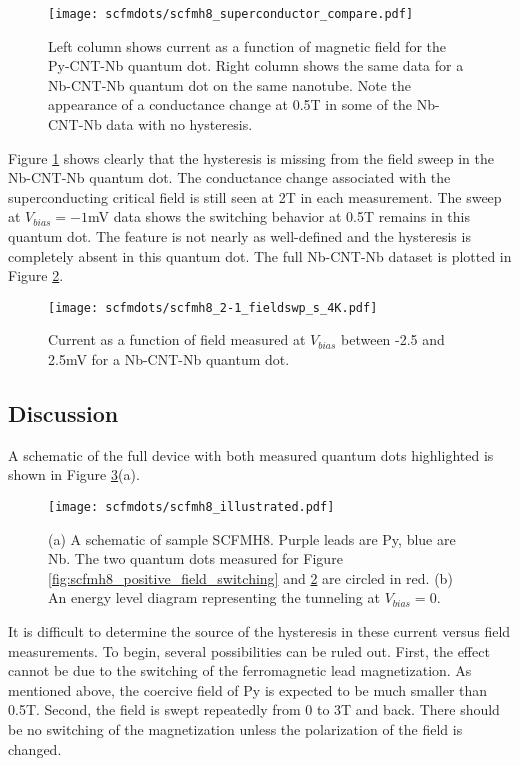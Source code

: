 \begin{figure}
    \centering
    \texttt{[image: scfmdots/scfmh8\_superconductor\_compare.pdf]}
    \caption{Left column shows current as a function of magnetic field for the Py-CNT-Nb quantum dot. Right column shows the same data for a Nb-CNT-Nb quantum dot on the same nanotube. Note the appearance of a conductance change at 0.5T in some of the Nb-CNT-Nb data with no hysteresis.}
    \label{fig:scfmh8_superconductor_compare}
\end{figure}

Figure \ref{fig:scfmh8_superconductor_compare} shows clearly that the hysteresis is missing from the field sweep in the Nb-CNT-Nb quantum dot. The conductance change associated with the superconducting critical field is still seen at 2T in each measurement. The sweep at $V_{bias}=-1$mV data shows the switching behavior at 0.5T remains in this quantum dot. The feature is not nearly as well-defined and the hysteresis is completely absent in this quantum dot. The full Nb-CNT-Nb dataset is plotted in Figure \ref{fig:scfmh8_all_superconducting}. 

\begin{figure}
    \centering
    \texttt{[image: scfmdots/scfmh8\_2-1\_fieldswp\_s\_4K.pdf]}
    \caption{Current as a function of field measured at $V_{bias}$ between -2.5 and 2.5mV for a Nb-CNT-Nb quantum dot. }
    \label{fig:scfmh8_all_superconducting}
\end{figure}

\subsection{Discussion}

A schematic of the full device with both measured quantum dots highlighted is shown in Figure \ref{fig:scfmh8_illustration}(a). 

\begin{figure}
    \centering
    \texttt{[image: scfmdots/scfmh8\_illustrated.pdf]}
    \caption{(a) A schematic of sample SCFMH8. Purple leads are Py, blue are Nb. The two quantum dots measured for Figure \ref{fig:scfmh8_positive_field_switching} and \ref{fig:scfmh8_all_superconducting} are circled in red. (b) An energy level diagram representing the tunneling at $V_{bias}=0$.}
    \label{fig:scfmh8_illustration}
\end{figure}

It is difficult to determine the source of the hysteresis in these current versus field measurements. To begin, several possibilities can be ruled out. First, the effect cannot be due to the switching of the ferromagnetic lead magnetization. As mentioned above, the coercive field of Py is expected to be much smaller than 0.5T. Second, the field is swept repeatedly from 0 to 3T and back. There should be no switching of the magnetization unless the polarization of the field is changed.

